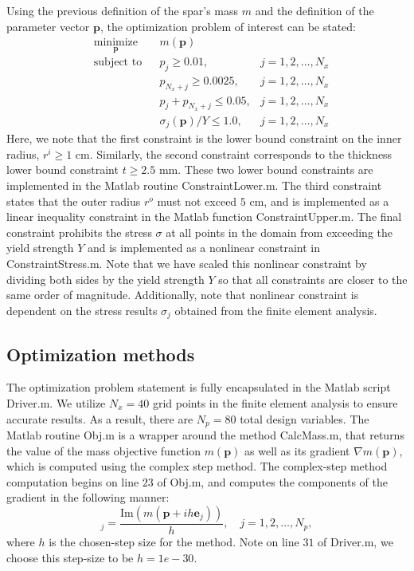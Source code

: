 \documentclass[11pt]{article}
\newcommand{\bs}[1] {\boldsymbol{#1}}
\begin{document}
Using the previous definition of the spar's mass $m$ and the
definition of the parameter vector $\bs{p}$, the
optimization problem of interest can be stated:
\begin{equation}
\begin{aligned}
& \underset{\bs{p}}{\text{minimize}}
& & m(\bs{p}) \\
& \text{subject to}
& & p_j \geq 0.01,                    &j=1,2,\dots,N_x \\
&&& p_{N_x+j} \geq 0.0025,            &j=1,2,\dots,N_x\\
&&& p_j + p_{N_x +j} \leq 0.05,       &j=1,2,\dots,N_x \\
&&& \sigma_j(\bs{p})/Y \leq 1.0,      &j=1,2,\dots,N_x
\end{aligned}
\end{equation}
Here, we note that the first constraint is the lower bound
constraint on the inner radius, $r^i \geq 1$ cm. Similarly,
the second constraint corresponds to the thickness lower
bound constraint $t \geq 2.5$ mm. These two lower bound
constraints are implemented in the Matlab routine
ConstraintLower.m. The third constraint states that the
outer radius $r^o$ must not exceed $5$ cm, and is implemented
as a linear inequality constraint in the Matlab function
ConstraintUpper.m. The final constraint prohibits the
stress $\sigma$ at all points in the domain from exceeding
the yield strength $Y$ and is implemented as a nonlinear
constraint in ConstraintStress.m. Note that we have scaled
this nonlinear constraint by dividing both sides by the
yield strength $Y$ so that all constraints are closer
to the same order of magnitude. Additionally, note that
nonlinear constraint is dependent on the stress results
$\sigma_j$ obtained from the finite element analysis.

\subsection{Optimization methods}

The optimization problem statement is fully encapsulated
in the Matlab script Driver.m. We utilize $N_x=40$ grid
points in the finite element analysis to ensure accurate
results. As a result, there are $N_p=80$ total design
variables. The Matlab routine Obj.m is a wrapper around
the method CalcMass.m, that returns the value of the
mass objective function $m(\bs{p})$ as well as its
gradient $\nabla m(\bs{p})$, which is computed using
the complex step method. The complex-step method
computation begins on line $23$ of Obj.m, and computes the
components of the gradient in the following manner:
\begin{equation}
[ \nabla m(\bs{p}) ]_j = \frac{\text{Im}(m( \bs{p} + i h \bs{e}_j))}{h},
\quad j=1,2,\dots,N_p,
\end{equation}
where $h$ is the chosen-step size for the method. Note
on line $31$ of Driver.m, we choose this step-size
to be $h=1e-30$. 
\end{document}
